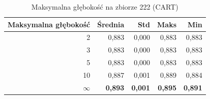 \begin{table}[htbp]
\centering
\small
\setlength{\tabcolsep}{6pt}
\renewcommand{\arraystretch}{1.2}
\caption{Maksymalna głębokość na zbiorze 222 (CART)}
\label{tab:CART_max_depth_222}
\begin{tabular}{r|r|r|r|r}
\toprule
Maksymalna głębokość & Średnia & Std & Maks & Min \\
\hline
2 & 0,883 & 0,000 & 0,883 & 0,883 \\
3 & 0,883 & 0,000 & 0,883 & 0,883 \\
5 & 0,883 & 0,000 & 0,883 & 0,883 \\
10 & 0,887 & 0,001 & 0,889 & 0,884 \\
\textbf{$\infty$} & \textbf{0,893} & \textbf{0,001} & \textbf{0,895} & \textbf{0,891} \\
\bottomrule
\end{tabular}
\end{table}